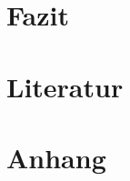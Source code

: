 \documentclass[4paper,10pt]{article}
\begin{document}
\section{Fazit}
\newpage





\setcounter{section}{5} 
\renewcommand{\thesection}{\Roman{section}}

\section{\hspace{0.2cm}Literatur}
\newpage

\section{\hspace{0.1cm}Anhang}
\newpage
\end{document}
